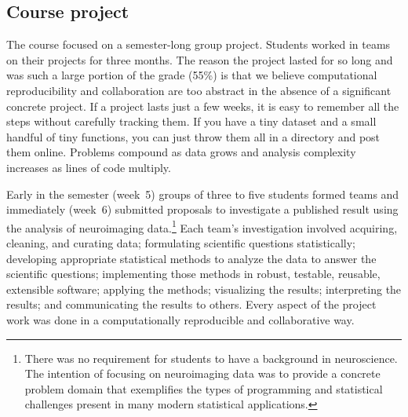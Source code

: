 \subsection{Course project}\label{project}

The course focused on a semester-long group project.
Students worked in teams on their projects for three months.
The reason the project lasted for so long and was such a large portion of the grade (55\%)
is that we believe computational reproducibility and collaboration
are too abstract in the absence of a significant concrete project.
If a project lasts just a few weeks, it is easy to remember all the steps
without carefully tracking them.
If you have a tiny dataset and a small handful of tiny functions, you can just
throw them all in a directory and post them online.
Problems compound as data grows and analysis complexity increases as lines of
code multiply.


Early in the semester (week~5) groups of three to five students formed teams
and immediately (week~6) submitted proposals to investigate
a published result using the analysis of neuroimaging data.\footnote{There
was no requirement for students to have a background in neuroscience.
The intention of focusing on neuroimaging data was to provide a concrete problem
domain that exemplifies the types of programming and statistical challenges
present in many modern statistical applications.}
Each team's investigation involved
acquiring, cleaning, and curating data;
formulating scientific questions statistically;
developing appropriate statistical methods
to analyze the data to answer the scientific questions;
implementing those methods in robust, testable, reusable, extensible software;
applying the methods;
visualizing the results;
interpreting the results;
and communicating the results to others.
Every aspect of the project work was done in a computationally reproducible
and collaborative way.


